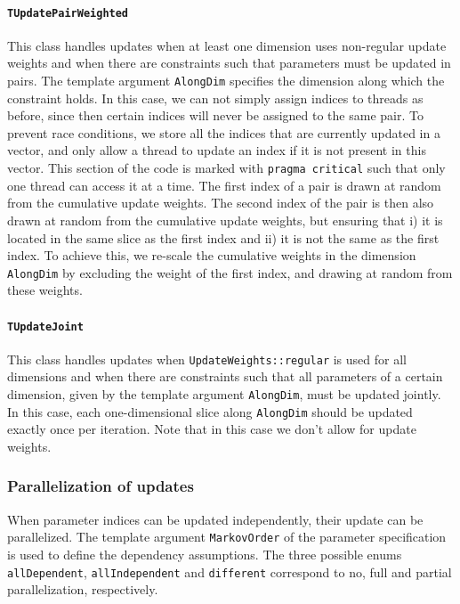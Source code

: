 \documentclass[a4paper,11pt]{article}
\newcommand{\class}[1]{\texttt{#1}}
\newcommand{\type}[1]{\texttt{#1}}
\newcommand{\enum}[1]{\texttt{#1}}
\newcommand{\template}[1]{\texttt{#1}}
\begin{document}
\paragraph{\class{TUpdatePairWeighted}} This class handles updates when at least one dimension uses non-regular update weights and when there are constraints such that parameters must be updated in pairs. The template argument \template{AlongDim} specifies the dimension along which the constraint holds. In this case, we can not simply assign indices to threads as before, since then certain indices will never be assigned to the same pair. To prevent race conditions, we store all the indices that are currently updated in a vector, and only allow a thread to update an index if it is not present in this vector. This section of the code is marked with \texttt{pragma critical} such that only one thread can access it at a time. The first index of a pair is drawn at random from the cumulative update weights. The second index of the pair is then also drawn at random from the cumulative update weights, but ensuring that i) it is located in the same slice as the first index and ii) it is not the same as the first index. To achieve this, we re-scale the cumulative weights in the dimension \template{AlongDim} by excluding the weight of the first index, and drawing at random from these weights.

\paragraph{\class{TUpdateJoint}} This class handles updates when \enum{UpdateWeights::regular} is used for all dimensions and when there are constraints such that all parameters of a certain dimension, given by the template argument \template{AlongDim}, must be updated jointly. In this case, each one-dimensional slice along \template{AlongDim} should be updated exactly once per iteration. Note that in this case we don't allow for update weights.

\subsubsection{Parallelization of updates}\label{section:MarkovOrder}

When parameter indices can be updated independently, their update can be parallelized. The template argument \texttt{MarkovOrder} of the parameter specification is used to define the dependency assumptions.
The three possible enums \type{allDependent}, \type{allIndependent} and \type{different} correspond to no, full and partial parallelization, respectively.
\end{document}
